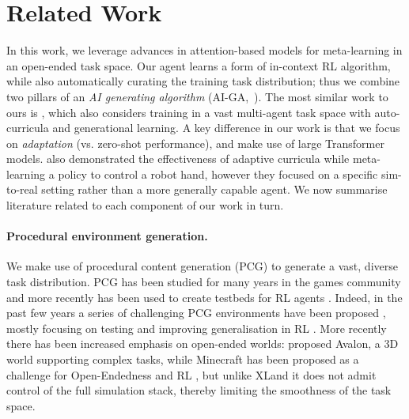 \section{Related Work} \label{sec:related_work}

In this work, we leverage advances in attention-based models for meta-learning in an open-ended task space. Our agent learns a form of in-context RL algorithm, while also automatically curating the training task distribution; thus we combine two pillars of an \emph{AI generating algorithm} (AI-GA,~\citet{clune2019aiga}). The most similar work to ours is \citet{xland}, which also considers training in a vast multi-agent task space with auto-curricula and generational learning. A key difference in our work is that we focus on \emph{adaptation} (vs. zero-shot performance), and make use of large Transformer models. \citet{akkaya2019solving} also demonstrated the effectiveness of adaptive curricula while meta-learning a policy to control a robot hand, however they focused on a specific sim-to-real setting rather than a more generally capable agent. We now summarise literature related to each component of our work in turn. 

\paragraph{Procedural environment generation.} We make use of procedural content generation (PCG) to generate a vast, diverse task distribution. PCG has been studied for many years in the games community \citep{togelius2008evolving, pcg} and more recently has been used to create testbeds for RL agents \citep{pcg_illuminating, coinrun, raileanu2020ride}. Indeed, in the past few years a series of challenging PCG environments have been proposed \citep{obstacletower, cobbe2020procgen, kuettler2020nethack, samvelyan2021minihack, gym_minigrid, hafner2022benchmarking, https://doi.org/10.48550/arxiv.2206.06994}, mostly focusing on testing and improving generalisation in RL \citep{rl_generalization_survey, bhatt2022dsage, fontaine2021overcooked}. More recently there has been increased emphasis on open-ended worlds: \citet{albrecht2022avalon} proposed Avalon, a 3D world supporting complex tasks, while Minecraft \citep{johnson2016malmo} has been proposed as a challenge for Open-Endedness and RL \citep{minerl2021, fan2022minedojo, evocraft2021}, but unlike XLand it does not admit control of the full simulation stack, thereby limiting the smoothness of the task space. 

